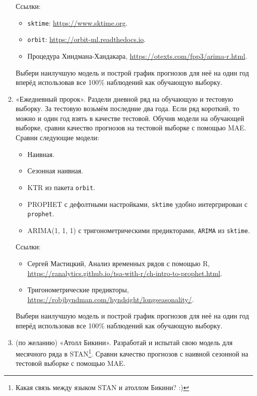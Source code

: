\documentclass[12pt]{article}
\begin{document}
\begin{enumerate}
    Ссылки: 
    \begin{itemize}
        \item \verb|sktime|: \url{https://www.sktime.org}.
        \item \verb|orbit|: \url{https://orbit-ml.readthedocs.io}.
        \item Процедура Хиндмана-Хандакара, \url{https://otexts.com/fpp3/arima-r.html}.
    \end{itemize}

    Выбери наилучшую модель и построй график прогнозов для неё на один год вперёд использовав все 100\% наблюдений как обучающую выборку.

    \item «Ежедневный пророк». 
    Раздели дневной ряд на обучающую и тестовую выборку. За тестовую возьмём последние два года. Если ряд короткий, то можно и один год взять в качестве тестовой.
    Обучив модели на обучающей выборке, сравни качество прогнозов
    на тестовой выборке с помощью MAE. Сравни следующие модели:

    \begin{itemize}
        \item Наивная.
        \item Сезонная наивная.
        \item KTR из пакета \verb|orbit|.
        \item PROPHET с дефолтными настройками, \verb|sktime| удобно интергрирован с \verb|prophet|.
        \item ARIMA(1, 1, 1) с тригонометрическими предикторами, \verb|ARIMA| из \verb|sktime|.
    \end{itemize}

    Ссылки: 
    \begin{itemize}
        \item Сергей Мастицкий, Анализ временных рядов с помощью R, \url{https://ranalytics.github.io/tsa-with-r/ch-intro-to-prophet.html}.
        \item Тригонометрические предикторы, \url{https://robjhyndman.com/hyndsight/longseasonality/}.
    \end{itemize}


    Выбери наилучшую модель и построй график прогнозов для неё на один год вперёд использовав все 100\% наблюдений как обучающую выборку.


    \item (по желанию) «Атолл Бикини». Разработай и испытай свою модель для месячного ряда в STAN\footnote{Какая связь между языком STAN и атоллом Бикини? :)}.
    Сравни качество прогнозов с наивной сезонной на тестовой выборке с помощью MAE. 
    


\end{enumerate}
\end{document}
